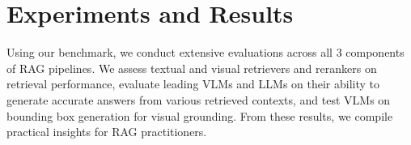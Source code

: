 



\section{Experiments and Results}

Using our benchmark, we conduct extensive evaluations across all 3 components of RAG pipelines. We assess textual and visual retrievers and rerankers on retrieval performance, evaluate leading VLMs and LLMs on their ability to generate accurate answers from various retrieved contexts, and test VLMs on bounding box generation for visual grounding. From these results, we compile practical insights for RAG practitioners.


